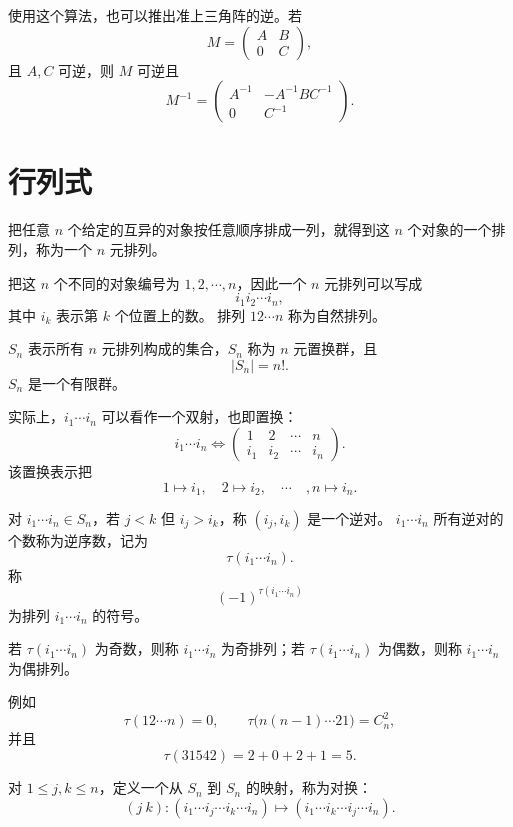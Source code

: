 使用这个算法，也可以推出准上三角阵的逆。若
\[
M=\begin{pmatrix}
	A&B\\
	0&C
\end{pmatrix},
\]
且 $A,C$ 可逆，则 $M$ 可逆且
\[
M^{-1}=\begin{pmatrix}
	A^{-1}&-A^{-1}BC^{-1}\\
	0&C^{-1}
\end{pmatrix}.
\]
\section{行列式}

\begin{definition}\label{3.6.1}\label{p1:concept:c3-l1812}
	把任意 $n$ 个给定的互异的对象按任意顺序排成一列，就得到这 $n$ 个对象的一个排列，称为一个 $n$ 元排列。
	
	把这 $n$ 个不同的对象编号为 $1,2,\cdots,n$，因此一个 $n$ 元排列可以写成
	\[
	i_1i_2\cdots i_n,
	\]
	其中 $i_k$ 表示第 $k$ 个位置上的数。
	排列 $12\cdots n$ 称为自然排列。
	
	$S_n$ 表示所有 $n$ 元排列构成的集合，$S_n$ 称为 $n$ 元置换群，且
	\[
	|S_n|=n!.
	\]
	$S_n$ 是一个有限群。
\end{definition}
实际上，$i_1\cdots i_n$ 可以看作一个双射，也即置换：
\[
i_1\cdots i_n
\Longleftrightarrow
\begin{pmatrix}
	1&2&\cdots&n\\
	i_1&i_2&\cdots&i_n
\end{pmatrix}.
\]
该置换表示把
\[
1\mapsto i_1,
\quad
2\mapsto i_2,
\quad\cdots\quad,
n\mapsto i_n.
\]
\begin{definition}\label{3.6.2}\label{p1:concept:c3-l1845}
	对 $i_1\cdots i_n\in S_n$，若 $j<k$ 但 $i_j>i_k$，称 $(i_j,i_k)$ 是一个逆对。
	$i_1\cdots i_n$ 所有逆对的个数称为逆序数，记为
	\[
	\tau(i_1\cdots i_n).
	\]
	称
	\[
	(-1)^{\tau(i_1\cdots i_n)}
	\]
	为排列 $i_1\cdots i_n$ 的符号。
	
	若 $\tau(i_1\cdots i_n)$ 为奇数，则称 $i_1\cdots i_n$ 为奇排列；若 $\tau(i_1\cdots i_n)$ 为偶数，则称 $i_1\cdots i_n$ 为偶排列。
	
\end{definition}
例如
\[
\tau(12\cdots n)=0,
\qquad
\tau\bigl(n(n-1)\cdots 21\bigr)=C_n^2,
\]
并且
\[
\tau(31542)=2+0+2+1=5.
\]
\begin{definition}\label{3.6.3}\label{p1:concept:c3-l1870}
	对 $1\leq j,k\leq n$，定义一个从 $S_n$ 到 $S_n$ 的映射，称为对换：
	\[
	(j\ k):
	(i_1\cdots i_j\cdots i_k\cdots i_n)
	\longmapsto
	(i_1\cdots i_k\cdots i_j\cdots i_n).
	\]
\end{definition}

